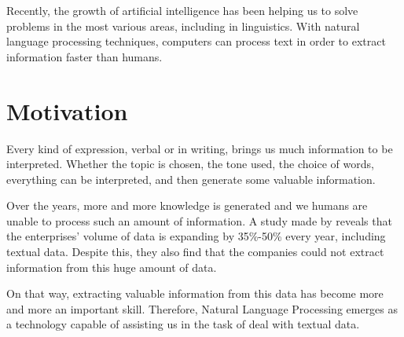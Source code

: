 Recently, the growth of artificial intelligence has been helping us to solve problems in the most various areas, including in linguistics. With natural language processing techniques, computers can process text in order to extract information faster than humans.

\section{Motivation}




Every kind of expression, verbal or in writing, brings us much information to be interpreted. Whether the topic is chosen, the tone used, the choice of words, everything can be interpreted, and then generate some valuable information.

Over the years, more and more knowledge is generated and we humans are unable to process such an amount of information. A study made by  reveals that the enterprises' volume of data is expanding by 35\%-50\% every year, including textual data. Despite this, they also find that the companies could not extract information from this huge amount of data.

On that way, extracting valuable information from this data has  become more and more an important skill. Therefore, Natural Language Processing emerges as a technology capable of assisting us in the task of deal with textual data.

